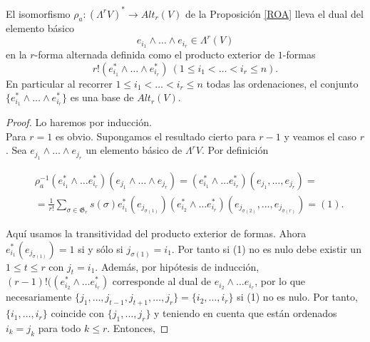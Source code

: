 \documentclass[\main/VD_completo.tex]{subfiles}
\begin{document}
\begin{proposition}\label{prop:base-alt}
El isomorfismo \( \rho_a\colon(\Lambda^rV)^*\to Alt_r(V)  \) de la Proposición \ref{ROA}
lleva el dual del elemento básico 
\[ e_{i_1}\wedge\ldots \wedge e_{i_r}\in \Lambda^r(V)
\]
en la \(r\)-forma alternada definida como el producto exterior de $1$-formas 
\[r!(e_{i_1}^*\wedge\ldots\wedge e_{i_r}^*) \ (1\leq i_1< \ldots<i_r\leq n).
\] 
En particular al recorrer  \( 1\leq i_1< \ldots<i_r\leq n  \) todas las
ordenaciones, el conjunto \( \{e_{i_1}^*\wedge\ldots\wedge e_{i_r}^*\}\) es
una base de \( Alt_r(V) \).
\end{proposition}

\begin{proof}
Lo haremos por inducción.\\
Para \(r=1\) es obvio. Supongamos el resultado cierto para \(r-1\) y veamos el caso \(r\). Sea $e_{j_1} \wedge \ldots \wedge e_{j_r}$ un elemento básico de \(\Lambda^r V\). Por definición

\begin{equation}
 \label{proof:prop-alt}
\begin{aligned}
&\rho_a^{-1}(e_{i_1}^*\wedge\ldots e_{i_r}^*)(e_{j_1}\wedge\ldots\wedge e_{j_r}) =(e_{i_1}^*\wedge\ldots e_{i_r}^*)(e_{j_1},\ldots, e_{j_r})=\\
&=\frac{1}{r!}\sum_{\sigma\in \mathfrak{G}_r} s(\sigma)e_{i_1}^*(e_{j_{\sigma(1)}})(e_{i_2}^*\wedge\ldots e_{i_r}^*)(e_{j_{\sigma(2)}},\ldots, e_{j_{\sigma(r)}}) = (1).
\end{aligned}
\end{equation}

Aquí usamos la transitividad del producto exterior de formas. Ahora \( e_{i_1}^*(e_{j_{\sigma(1)}})=1 \) si y sólo si  \( j_{\sigma(1)}=i_1 \).
Por tanto si (1) no es nulo debe existir un \( 1\leq t\leq r \) con \( j_t=i_1 \). Además, por hipótesis de inducción, \( (r-1)!((e_{i_2}^*\wedge\ldots e_{i_r}^*) \) corresponde al dual de \( e_{i_2}\wedge\ldots e_{i_r} \), por lo que necesariamente \( \{j_1,\ldots,j_{t-1},j_{t+1},\ldots,j_r\}=\{i_2,\ldots,i_r\} \) si (1) no es nulo. Por tanto,  \(\{i_1,\ldots, i_r\}\) coincide con  \(\{j_1,\ldots, j_r\}\) y teniendo en cuenta que están ordenados \(i_k = j_k\) para todo \(k\leq r\). Entonces,   


\end{proof}
\end{document}
